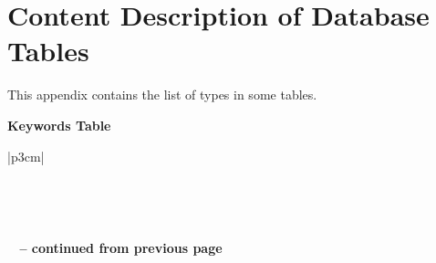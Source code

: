 %
%
%                 

\chapter{Content Description of Database Tables}
\label{sec:appendixl}

This appendix contains the list of types in some tables.

\textbf{Keywords Table}
\begin{longtable}{|p{3cm}|}
\caption{Keywords List} \vspace{0.25em} \\ \hline 

\hline {}  \\ \hline 
\endfirsthead

{{\bfseries \tablename\ \thetable{} -- continued from previous page}} \\
\hline {} \\ \hline 
\endhead

\hline {} \\ \hline
\endfoot


\end{longtable}
